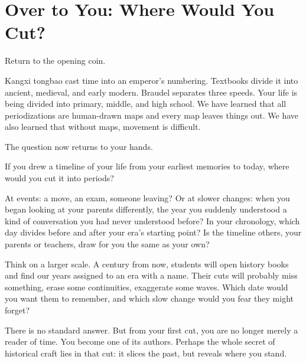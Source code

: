 \section{Over to You: Where Would You Cut?}
Return to the opening coin.

Kangxi tongbao cast time into an emperor's numbering. Textbooks divide it into ancient, medieval, and early modern. Braudel separates three speeds. Your life is being divided into primary, middle, and high school. We have learned that all periodizations are human-drawn maps and every map leaves things out. We have also learned that without maps, movement is difficult.

The question now returns to your hands.

If you drew a timeline of your life from your earliest memories to today, where would you cut it into periods?

At events: a move, an exam, someone leaving? Or at slower changes: when you began looking at your parents differently, the year you suddenly understood a kind of conversation you had never understood before? In your chronology, which day divides before and after your era's starting point? Is the timeline others, your parents or teachers, draw for you the same as your own?

Think on a larger scale. A century from now, students will open history books and find our years assigned to an era with a name. Their cuts will probably miss something, erase some continuities, exaggerate some waves. Which date would you want them to remember, and which slow change would you fear they might forget?

There is no standard answer. But from your first cut, you are no longer merely a reader of time. You become one of its authors. Perhaps the whole secret of historical craft lies in that cut: it slices the past, but reveals where you stand.

